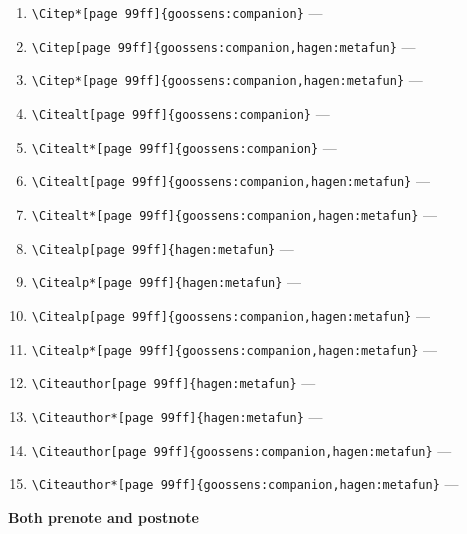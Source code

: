 \documentclass[12pt]{article}
\begin{document}
\begin{enumerate}
\item
\verb|\Citep*[page 99ff]{goossens:companion}| ---
\item
\verb|\Citep[page 99ff]{goossens:companion,hagen:metafun}| ---
\item
\verb|\Citep*[page 99ff]{goossens:companion,hagen:metafun}| ---
\item
\verb|\Citealt[page 99ff]{goossens:companion}| ---
\item
\verb|\Citealt*[page 99ff]{goossens:companion}| ---
\item
\verb|\Citealt[page 99ff]{goossens:companion,hagen:metafun}| ---
\item
\verb|\Citealt*[page 99ff]{goossens:companion,hagen:metafun}| ---
\item
\verb|\Citealp[page 99ff]{hagen:metafun}| ---
\item
\verb|\Citealp*[page 99ff]{hagen:metafun}| ---
\item
\verb|\Citealp[page 99ff]{goossens:companion,hagen:metafun}| ---
\item
\verb|\Citealp*[page 99ff]{goossens:companion,hagen:metafun}| ---
\item
\verb|\Citeauthor[page 99ff]{hagen:metafun}| ---
\item
\verb|\Citeauthor*[page 99ff]{hagen:metafun}| ---
\item
\verb|\Citeauthor[page 99ff]{goossens:companion,hagen:metafun}| ---
\item
\verb|\Citeauthor*[page 99ff]{goossens:companion,hagen:metafun}| ---
\end{enumerate}

\textbf{Both prenote and postnote}
\end{document}
